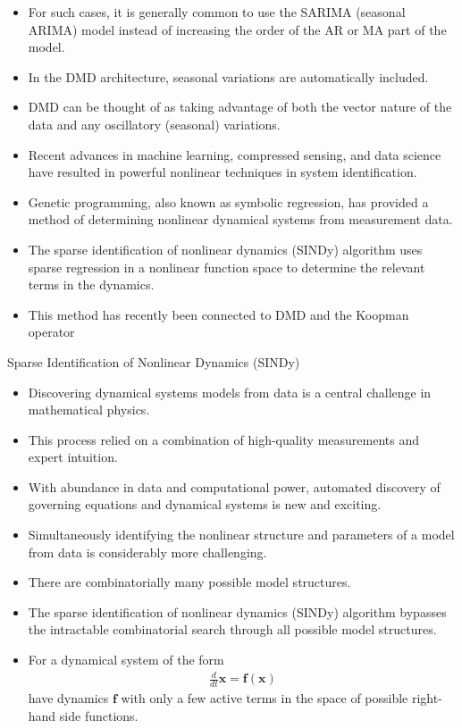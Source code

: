\documentclass[hyperref={pdfpagemode=FullScreen},aspectratio=169]{beamer}
\begin{document}
\begin{frame}{}
\begin{itemize}
\setlength\itemsep{1em}
\item For such cases, it is generally common to use the SARIMA (seasonal ARIMA) model instead of
increasing the order of the AR or MA part of the model.
\item In the DMD architecture, seasonal variations are automatically included.
\item DMD can be thought of as taking advantage of both the vector nature of the data and any oscillatory (seasonal) variations. 
\item Recent advances in machine learning, compressed sensing, and data science have resulted in powerful nonlinear techniques in system identification. 
\item Genetic programming, also known as symbolic regression, has provided a method of determining nonlinear dynamical systems from measurement data.
\item The sparse identification of nonlinear dynamics (SINDy) algorithm uses sparse regression in a nonlinear function space to determine the relevant terms in the dynamics.
\item This method has recently been connected to DMD and the Koopman operator
\end{itemize}
\end{frame}
\begin{frame}{Sparse Identification of Nonlinear Dynamics (SINDy)}
\begin{itemize}
\setlength\itemsep{0.25em}
\item Discovering dynamical systems models from data is a central challenge in mathematical
physics.
\item This process relied on a combination of high-quality measurements and expert intuition.
\item With abundance in data and computational power, automated discovery of governing equations and dynamical systems is new and exciting.
\item Simultaneously identifying the nonlinear structure and parameters of a model from data is considerably more challenging.
\item There are combinatorially many possible model structures.
\item The sparse identification of nonlinear dynamics (SINDy) algorithm bypasses the intractable combinatorial search through all possible model structures.
\item For a dynamical system of the form
\begin{align}\label{eq30}
\frac{d}{dt}\mathbf{x}=\mathbf{f}(\mathbf{x})
\end{align}
have dynamics $\mathbf{f}$ with only a few active terms in the space of possible right-hand side functions.

\end{itemize}
\end{frame}
\end{document}
